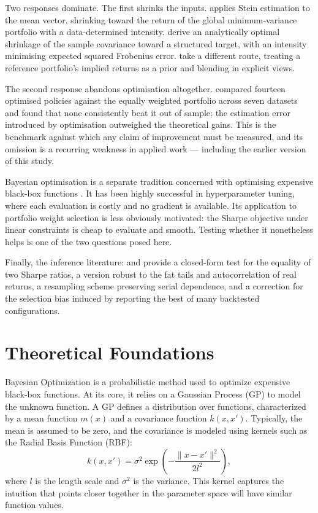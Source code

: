 \documentclass[a4paper,12pt]{article}
\begin{document}
Two responses dominate. The first shrinks the inputs. \citet{jorion1986} applies
Stein estimation to the mean vector, shrinking toward the return of the global
minimum-variance portfolio with a data-determined intensity.
\citet{ledoit2004} derive an analytically optimal shrinkage of the sample
covariance toward a structured target, with an intensity minimising expected
squared Frobenius error. \citet{black1992} take a different route, treating a
reference portfolio's implied returns as a prior and blending in explicit views.

The second response abandons optimisation altogether. \citet{demiguel2009}
compared fourteen optimised policies against the equally weighted portfolio across
seven datasets and found that none consistently beat it out of sample; the
estimation error introduced by optimisation outweighed the theoretical gains. This
is the benchmark against which any claim of improvement must be measured, and its
omission is a recurring weakness in applied work --- including the earlier version
of this study.

Bayesian optimisation is a separate tradition concerned with optimising expensive
black-box functions \citep{snoek2012, shahriari2016, frazier2018}. It has been
highly successful in hyperparameter tuning, where each evaluation is costly and no
gradient is available. Its application to portfolio weight selection is less
obviously motivated: the Sharpe objective under linear constraints is cheap to
evaluate and smooth. Testing whether it nonetheless helps is one of the two
questions posed here.

Finally, the inference literature: \citet{jobson1981} and \citet{memmel2003}
provide a closed-form test for the equality of two Sharpe ratios,
\citet{ledoit2008} a version robust to the fat tails and autocorrelation of real
returns, \citet{politis1994} a resampling scheme preserving serial dependence, and
\citet{bailey2014} a correction for the selection bias induced by reporting the
best of many backtested configurations.

\section{Theoretical Foundations}
Bayesian Optimization is a probabilistic method used to optimize expensive
black-box functions. At its core, it relies on a Gaussian Process (GP) to model
the unknown function. A GP defines a distribution over functions, characterized by
a mean function \( m(x) \) and a covariance function \( k(x, x') \). Typically,
the mean is assumed to be zero, and the covariance is modeled using kernels such
as the Radial Basis Function (RBF):
\[
k(x, x') = \sigma^2 \exp\left(-\frac{\|x - x'\|^2}{2l^2}\right),
\]
where \( l \) is the length scale and \( \sigma^2 \) is the variance. This kernel
captures the intuition that points closer together in the parameter space will
have similar function values.
\end{document}
